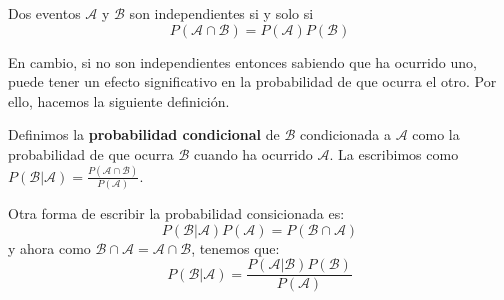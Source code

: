 \begin{definicion}
Dos eventos $\mathcal{A}$ y $\mathcal{B}$ son independientes si y solo si
\[ P(\mathcal{A} \cap \mathcal{B})=P(\mathcal{A})P(\mathcal{B}) \]
\end{definicion}
En cambio, si no son independientes entonces sabiendo que ha ocurrido uno, puede tener un efecto significativo en la probabilidad de que ocurra el otro. Por ello, hacemos la siguiente definición.
\begin{definicion}
Definimos la \textbf{probabilidad condicional} de $\mathcal{B}$ condicionada a $\mathcal{A}$ como la probabilidad de que ocurra $\mathcal{B}$ cuando ha ocurrido $\mathcal{A}$. La escribimos como $P(\mathcal{B}\vert \mathcal{A})=\frac{P(\mathcal{A} \cap \mathcal{B})}{P(\mathcal{A})}$.
\end{definicion}
Otra forma de escribir la probabilidad consicionada es:
\[ P(\mathcal{B}\vert \mathcal{A})P(\mathcal{A})=P(\mathcal{B} \cap \mathcal{A}) \]
y ahora como $\mathcal{B} \cap \mathcal{A}=\mathcal{A} \cap \mathcal{B}$, tenemos que:
\[ P(\mathcal{B}\vert \mathcal{A})=\frac{P(\mathcal{A}\vert \mathcal{B})P(\mathcal{B})}{P(\mathcal{A})} \]
\cite{forsyth2018probability}

